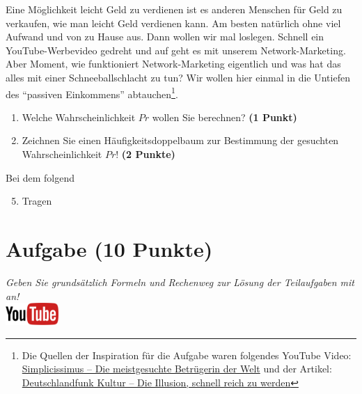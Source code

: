 \documentclass[a4paper, 10pt]{scrartcl}\usepackage[]{graphicx}\usepackage[]{xcolor}
\begin{document}
Eine M{\"o}glichkeit leicht Geld zu verdienen ist es anderen Menschen f{\"u}r Geld
zu verkaufen, wie man leicht Geld verdienen kann. Am besten nat{\"u}rlich ohne
viel Aufwand und von zu Hause aus. Dann wollen wir mal loslegen. Schnell
ein YouTube-Werbevideo gedreht und auf geht es mit unserem
Network-Marketing. Aber Moment, wie funktioniert Network-Marketing
eigentlich und was hat das alles mit einer Schneeballschlacht zu tun? Wir
wollen hier einmal in die Untiefen des "`passiven Einkommens"'
abtauchen\footnote{Die Quellen der Inspiration f{\"u}r die Aufgabe waren
  folgendes YouTube Video:
  \href{https://youtu.be/UOKkZF_qK9M?si=uf4foJVFKfeQMwSw}{Simplicissimus --
    Die meistgesuchte Betr{\"u}gerin der Welt} und der Artikel:
  \href{https://www.deutschlandfunkkultur.de/netzwerk-marketing-die-illusion-schnell-reich-zu-werden-100.html}{
    Deutschlandfunk Kultur -- Die Illusion, schnell reich zu werden}}.

\begin{enumerate}
\item Welche Wahrscheinlichkeit $Pr$ wollen Sie berechnen? \textbf{(1 Punkt)}
\item Zeichnen Sie einen H{\"a}ufigkeitsdoppelbaum zur Bestimmung der gesuchten
  Wahrscheinlichkeit $Pr$! \textbf{(2 Punkte)} 
\end{enumerate}

Bei dem folgend

\begin{enumerate}
  \setcounter{enumi}{4}
\item Tragen 
\end{enumerate}



 
\clearpage

\section{Aufgabe \hfill (10 Punkte)}

\textit{Geben Sie grunds{\"a}tzlich Formeln und Rechenweg zur L{\"o}sung der
  Teilaufgaben mit an!} \\[1Ex]

\hfill\href{https://youtu.be/paXxVmyfDPs}{\includegraphics[width =
  2cm]{img/youtube}} %
\hspace{2Ex}
\end{document}
